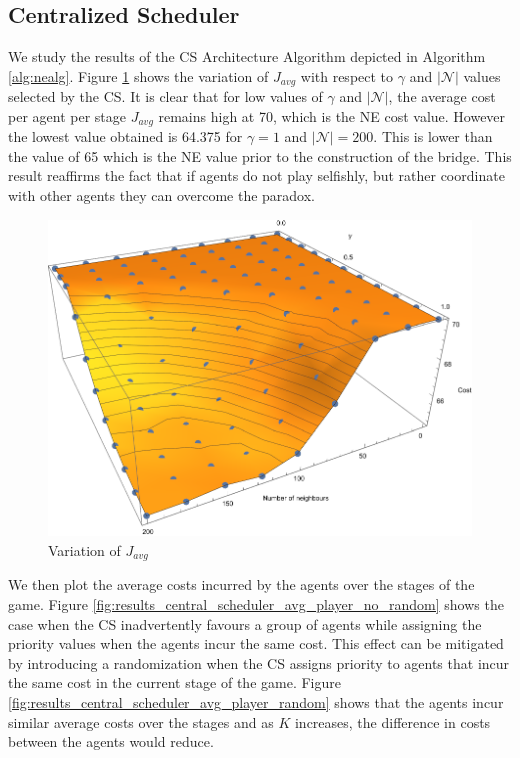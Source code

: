 \documentclass[11pt, letterpaper]{article}
\begin{document}
\subsection{Centralized Scheduler}
We study the results of the CS Architecture Algorithm depicted in Algorithm \ref{alg:nealg}. Figure \ref{fig:results_central_scheduler_plot} shows the variation of $J_{avg}$ with respect to $\gamma$ and $|\mathcal{N}|$ values selected by the CS. It is clear that for low values of $\gamma$ and $|\mathcal{N}|$, the average cost per agent per stage $J_{avg}$ remains high at 70, which is the NE cost value. However the lowest value obtained is 64.375  for $\gamma =1$ and $|\mathcal{N}|=200$. This is lower than the value of 65 which is the NE value prior to the construction of the bridge. This result reaffirms the fact that if agents do not play selfishly, but rather coordinate with other agents they can overcome the paradox.
\begin{figure}[htbp]
    \centering
    \includegraphics[width=0.7\linewidth]{images/CS_costs.pdf}
    \caption{Variation of $J_{avg}$}
    \label{fig:results_central_scheduler_plot}
\end{figure}

We then plot the average costs incurred by the agents over the stages of the game. Figure \ref{fig:results_central_scheduler_avg_player_no_random} shows the case when the CS inadvertently favours a group of agents while assigning the priority values when the agents incur the same cost. This effect can be mitigated by introducing a randomization when the CS assigns priority to agents that incur the same cost in the current stage of the game. Figure \ref{fig:results_central_scheduler_avg_player_random} shows that the agents incur similar average costs over the stages and as $K$ increases, the difference in costs between the agents would reduce. 
\end{document}
